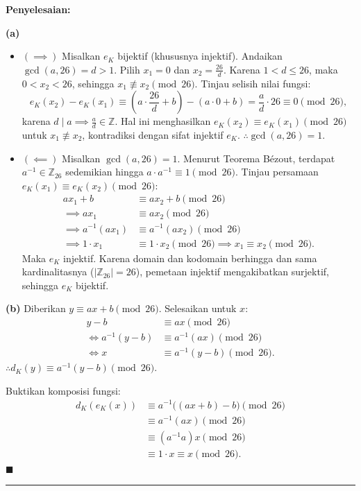 \documentclass[11pt,a4paper]{article}
\newenvironment{solusi}{\noindent\textbf{\textsf{Penyelesaian:}}\par\vspace{0.2em}}{\hfill$\blacksquare$\vspace{1em}\par\hrule\vspace{1em}}
\begin{document}
\begin{solusi}
\textbf{(a)} 
\begin{itemize}[leftmargin=*]
    \item $(\implies)$ Misalkan $e_K$ bijektif (khususnya injektif). Andaikan $\gcd(a, 26) = d > 1$.
    Pilih $x_1 = 0$ dan $x_2 = \frac{26}{d}$. Karena $1 < d \le 26$, maka $0 < x_2 < 26$, sehingga $x_1 \not\equiv x_2 \pmod{26}$.
    Tinjau selisih nilai fungsi:
    \[
    e_K(x_2) - e_K(x_1) \equiv \left(a \cdot \frac{26}{d} + b\right) - (a \cdot 0 + b) = \frac{a}{d} \cdot 26 \equiv 0 \pmod{26},
    \]
    karena $d \mid a \implies \frac{a}{d} \in \mathbb{Z}$.
    Hal ini menghasilkan $e_K(x_2) \equiv e_K(x_1) \pmod{26}$ untuk $x_1 \not\equiv x_2$, kontradiksi dengan sifat injektif $e_K$.
    $\therefore \gcd(a, 26) = 1$.
    
    \item $(\impliedby)$ Misalkan $\gcd(a, 26) = 1$. Menurut Teorema Bézout, terdapat $a^{-1} \in \mathbb{Z}_{26}$ sedemikian hingga $a \cdot a^{-1} \equiv 1 \pmod{26}$.
    Tinjau persamaan $e_K(x_1) \equiv e_K(x_2) \pmod{26}$:
    \begin{align*}
    ax_1 + b &\equiv ax_2 + b \pmod{26} \\
    \implies ax_1 &\equiv ax_2 \pmod{26} \\
    \implies a^{-1}(ax_1) &\equiv a^{-1}(ax_2) \pmod{26} \\
    \implies 1 \cdot x_1 &\equiv 1 \cdot x_2 \pmod{26} \implies x_1 \equiv x_2 \pmod{26}.
    \end{align*}
    Maka $e_K$ injektif. Karena domain dan kodomain berhingga dan sama kardinalitasnya ($|\mathbb{Z}_{26}| = 26$), pemetaan injektif mengakibatkan surjektif, sehingga $e_K$ bijektif.
\end{itemize}

\textbf{(b)} Diberikan $y \equiv ax + b \pmod{26}$. Selesaikan untuk $x$:
\begin{align*}
y - b &\equiv ax \pmod{26} \\
\iff a^{-1}(y - b) &\equiv a^{-1}(ax) \pmod{26} \\
\iff x &\equiv a^{-1}(y - b) \pmod{26}.
\end{align*}
$\therefore d_K(y) \equiv a^{-1}(y - b) \pmod{26}$.

Buktikan komposisi fungsi:
\begin{align*}
d_K(e_K(x)) &\equiv a^{-1}\big((ax + b) - b\big) \pmod{26} \\
&\equiv a^{-1}(ax) \pmod{26} \\
&\equiv (a^{-1}a)x \pmod{26} \\
&\equiv 1 \cdot x \equiv x \pmod{26}.
\end{align*}
\end{solusi}
\end{document}
